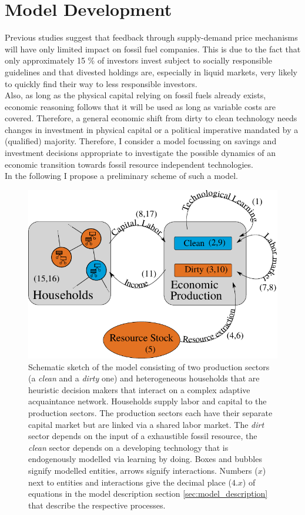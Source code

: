 \section{Model Development}  
\label{sec:heuristics_model}
Previous studies \cite{Ans2013} suggest that feedback through supply-demand price mechanisms will have only limited impact on fossil fuel companies. This is due to the fact that only approximately 15 \% of investors invest subject to socially responsible guidelines \cite{SIF2014Report} and that divested holdings are, especially in liquid markets, very likely to quickly find their way to less responsible investors. \\
Also, as long as the physical capital relying on fossil fuels already exists, economic reasoning follows that it will be used as long as variable costs are covered.
Therefore, a general economic shift from dirty to clean technology needs changes in investment in physical capital or a political imperative mandated by a (qualified) majority. Therefore, I consider a model focussing on savings and investment decisions appropriate to investigate the possible dynamics of an economic transition towards fossil resource independent technologies.\\
In the following I propose a preliminary scheme of such a model.

\newpage
\begin{figure}[t]
	\centering
	\includegraphics[width =.8 \textwidth]{figures/model_scheme_1.pdf}
        \caption{Schematic sketch of the model consisting of two production sectors (a \emph{clean} and a \emph{dirty} one) and heterogeneous households that are heuristic decision makers that interact on a complex adaptive acquaintance network. Households supply labor and capital to the production sectors. The production sectors each have their separate capital market but are linked via a shared labor market. The \emph{dirt} sector depends on the input of a exhaustible fossil resource, the \emph{clean} sector depends on a developing technology that is endogenously modelled via learning by doing. Boxes and bubbles signify modelled entities, arrows signify interactions. Numbers ($x$) next to entities and interactions give the decimal place ($4.x$) of equations in the model description section \ref{sec:model_description} that describe the respective processes.}
	\label{fig:model}
\end{figure}

